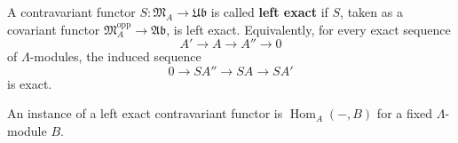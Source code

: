 A contravariant functor $S : \mathfrak{M}_A \rightarrow \mathfrak{Ub}$ is called \textbf{left exact} if $S$, taken as a covariant functor $\mathfrak{M}_A^{\text{opp}} \rightarrow \mathfrak{Ab}$, is left exact. Equivalently, for every exact sequence
$$A' \rightarrow A \rightarrow A'' \rightarrow 0$$
of $\Lambda$-modules, the induced sequence
$$0 \rightarrow SA'' \rightarrow SA \rightarrow SA'$$
is exact.

An instance of a left exact contravariant functor is $\operatorname{Hom}_A(-, B)$ for a fixed $\Lambda$-module $B$.
